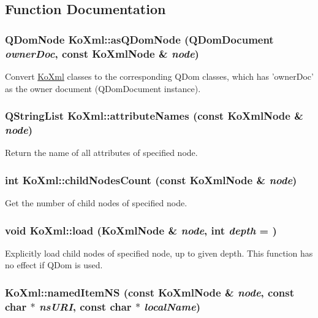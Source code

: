 \subsection{Function Documentation}
\hypertarget{namespaceKoXml_aa9562d7b4abde19cd063e70ca966e582}{
\subsubsection[{asQDomNode}]{\setlength{\rightskip}{0pt plus 5cm}QDomNode KoXml::asQDomNode (QDomDocument {\em ownerDoc}, \/  const {\bf KoXmlNode} \& {\em node})}}
\label{namespaceKoXml_aa9562d7b4abde19cd063e70ca966e582}
Convert \hyperlink{namespaceKoXml}{KoXml} classes to the corresponding QDom classes, which has 'ownerDoc' as the owner document (QDomDocument instance). \hypertarget{namespaceKoXml_a4859eaf343a885dc2c69889271e16b6a}{
\subsubsection[{attributeNames}]{\setlength{\rightskip}{0pt plus 5cm}QStringList KoXml::attributeNames (const {\bf KoXmlNode} \& {\em node})}}
\label{namespaceKoXml_a4859eaf343a885dc2c69889271e16b6a}
Return the name of all attributes of specified node. \hypertarget{namespaceKoXml_a741654edec9f17c65760b32b45069dcc}{
\subsubsection[{childNodesCount}]{\setlength{\rightskip}{0pt plus 5cm}int KoXml::childNodesCount (const {\bf KoXmlNode} \& {\em node})}}
\label{namespaceKoXml_a741654edec9f17c65760b32b45069dcc}
Get the number of child nodes of specified node. \hypertarget{namespaceKoXml_aaa2b101e7188f027c484537851115566}{
\subsubsection[{load}]{\setlength{\rightskip}{0pt plus 5cm}void KoXml::load ({\bf KoXmlNode} \& {\em node}, \/  int {\em depth} = {})}}
\label{namespaceKoXml_aaa2b101e7188f027c484537851115566}
Explicitly load child nodes of specified node, up to given depth. This function has no effect if QDom is used. \hypertarget{namespaceKoXml_af571b501c9481cab08bbcf9b9174e4f5}{
\subsubsection[{namedItemNS}]{ KoXml::namedItemNS (const {\bf KoXmlNode} \& {\em node}, \/  const char $\ast$ {\em nsURI}, \/  const char $\ast$ {\em localName})}}
